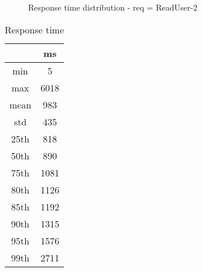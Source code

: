 \begin{minipage}{0.75\linewidth}
\begin{figure}[h]
\begin{adjustbox}{max width=1.0\linewidth, keepaspectratio}
  \end{adjustbox}
  \caption{Response time distribution - req = ReadUser-2}
\end{figure}
\end{minipage}\hfill\begin{minipage}{0.18\linewidth}
\begin{table}[h]
\begin{tabular}{|cc|}
\hline
\textbf{} & \textbf{ms}\\ \hline
 \Xhline{0.005\arrayrulewidth}
min & 5\\
 \Xhline{0.005\arrayrulewidth}
max & 6018\\
 \Xhline{0.005\arrayrulewidth}
mean & 983\\
 \Xhline{0.005\arrayrulewidth}
std & 435\\
\hline
\hline
 \Xhline{0.005\arrayrulewidth}
25th & 818\\
 \Xhline{0.005\arrayrulewidth}
50th & 890\\
 \Xhline{0.005\arrayrulewidth}
75th & 1081\\
 \Xhline{0.005\arrayrulewidth}
80th & 1126\\
 \Xhline{0.005\arrayrulewidth}
85th & 1192\\
 \Xhline{0.005\arrayrulewidth}
90th & 1315\\
 \Xhline{0.005\arrayrulewidth}
95th & 1576\\
 \Xhline{0.005\arrayrulewidth}
99th & 2711\\
\hline
\end{tabular}
\caption{Response time}
\end{table}
\end{minipage}\hfill